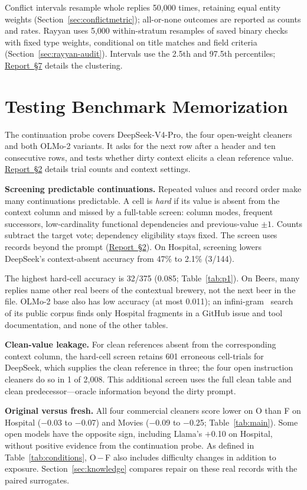\documentclass[sigconf, nonacm]{acmart}
\newcommand{\companionref}[1]{\href{https://github.com/hinsonver/CoRe-Benchmark/raw/refs/heads/main/paper/CoRe-Supplementary-Technical-Report.pdf\#nameddest=companion-#1}{Report~\S#1}}
\begin{document}
Conflict intervals resample whole replies 50,000 times, retaining equal entity weights
(Section~\ref{sec:conflictmetric}); all-or-none outcomes are reported as counts and rates.
Rayyan uses 5,000 within-stratum resamples of saved binary checks with fixed type weights,
conditional on title matches and field criteria (Section~\ref{sec:rayyan-audit}).
Intervals use the 2.5th and 97.5th percentiles; \companionref{7} details the clustering.

\section{Testing Benchmark Memorization}\label{sec:memorization}

The continuation probe covers DeepSeek-V4-Pro, the four open-weight cleaners and both OLMo-2
variants. It asks for the next row after a header and ten consecutive rows, and tests whether
dirty context elicits a clean reference value. \companionref{2} details trial counts and context settings.

\textbf{Screening predictable continuations.} Repeated values and record order make many
continuations predictable. A cell is \emph{hard} if its value is absent from the context column
and missed by a full-table screen: column modes, frequent successors, low-cardinality functional dependencies
and previous-value $\pm1$. Counts subtract the target vote; dependency eligibility stays fixed.
The screen uses records beyond the prompt (\companionref{2}). On Hospital, screening lowers
DeepSeek's context-absent accuracy from 47\% to 2.1\% (3/144).

The highest hard-cell accuracy is 32/375 (0.085; Table~\ref{tab:p1}). On Beers, many replies name
other real beers of the contextual brewery, not the next beer in the file.
OLMo-2 base also has low accuracy (at most 0.011); an
infini-gram~\cite{liu2024infinigram} search of its public corpus finds only Hospital fragments
in a GitHub issue and tool documentation, and none of the other tables.

\textbf{Clean-value leakage.} For clean references absent from the corresponding context column,
the hard-cell screen retains 601 erroneous cell-trials for DeepSeek, which supplies the clean
reference in three; the four open instruction cleaners do so in 1 of 2,008.
This additional screen uses the full clean table and clean predecessor---oracle
information beyond the dirty prompt.

\textbf{Original versus fresh.} All four commercial cleaners score lower on O than F on
Hospital ($-$0.03 to $-$0.07) and Movies ($-$0.09 to $-$0.25; Table~\ref{tab:main}). Some open
models have the opposite sign, including Llama's $+$0.10 on Hospital, without positive evidence
from the continuation probe. As defined in Table~\ref{tab:conditions}, O\,$-$\,F also includes difficulty changes
in addition to exposure. Section~\ref{sec:knowledge} compares repair on these real records with
the paired surrogates.
\end{document}
